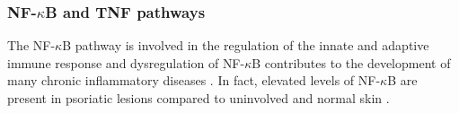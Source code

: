 


\subsubsection*{NF-$\kappa$B and TNF pathways}

The NF-$\kappa$B pathway is involved in the regulation of the innate and adaptive immune response and dysregulation of NF-$\kappa$B contributes to the development of many chronic inflammatory diseases \parencite{Liu2017}. In fact, elevated levels of NF-$\kappa$B are present in psoriatic lesions compared to uninvolved and normal skin \parencite{Lizzul2005}. 

